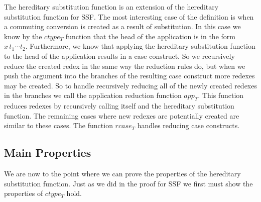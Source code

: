 The hereditary substitution function is an extension of the hereditary
substitution function for SSF.  The most interesting case of the
definition is when a commuting conversion is created as a result of
substitution.  In this case we know by the $ctype_T$ function that
the head of the application is in the form $x\,t_1 \cdots t_2$.
Furthermore, we know that applying the hereditary substitution
function to the head of the application results in a case construct.
So we recursively reduce the created redex in the same way the
reduction rules do, but when we push the argument into the branches of
the resulting case construct more redexes may be created.  So to
handle recursively reducing all of the newly created redexes in the
branches we call the application reduction function $app_T$.  This
function reduces redexes by recursively calling itself and the
hereditary substitution function.  The remaining cases where new
redexes are potentially created are similar to these cases.  The
function $rcase_T$ handles reducing case constructs.

\subsection{Main Properties}
\label{sec:properties_of_the_hereditary_substitution_function_ssfp}
We are now to the point where we can prove the properties of the
hereditary substitution function.  Just as we did in the proof for SSF
we first must show the properties of $ctype_T$ hold.


